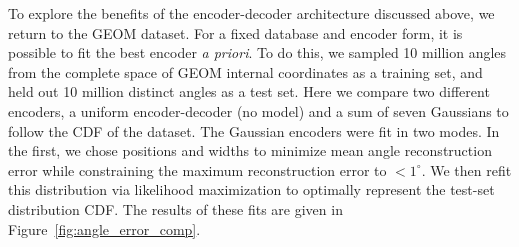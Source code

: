 \documentclass[%
 preprint,
superscriptaddress,
 amsmath,amssymb,
 aip,
 jcp,
]{revtex4-2}
\begin{document}

To explore the benefits of the encoder-decoder architecture discussed above, we return to the GEOM dataset.
For a fixed database and encoder form, it is possible to fit the best encoder \textit{a priori}.
To do this, we sampled 10 million angles from the complete space of GEOM internal coordinates as a training set, and held out 10 million distinct angles as a test set.
Here we compare two different encoders, a uniform encoder-decoder (no model) and a sum of seven Gaussians to follow the CDF of the dataset.
The Gaussian encoders were fit in two modes.
In the first, we chose positions and widths to minimize mean angle reconstruction error while constraining the maximum reconstruction error to $<1^\circ$.
We then refit this distribution via likelihood maximization to optimally represent the test-set distribution CDF.
The results of these fits are given in Figure~\ref{fig:angle_error_comp}.
\end{document}

